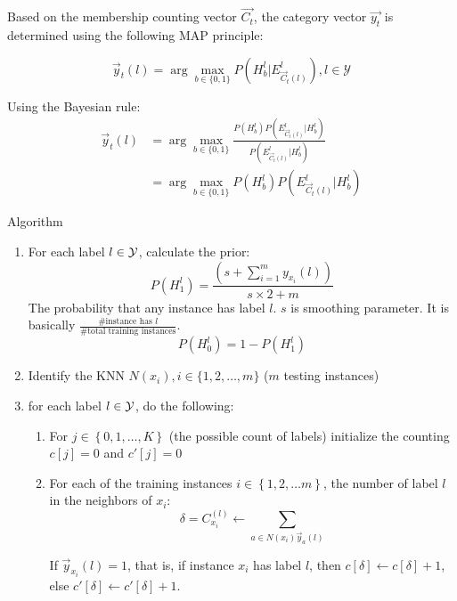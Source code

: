 Based on the membership counting vector $\vec{C_t}$, the category vector
$\vec{y_t}$ is determined using the following MAP principle:

\[ 
    \vec{y}_t(l) = \arg\max_{b\in \{0,1 \}} P(H_b^l|E_{\vec{C}_t(l)}^l), l
    \in \mathcal{Y}
\]

Using the Bayesian rule:
\begin{align*}
    \vec{y}_t(l) &= \arg\max_{b\in \{0, 1\}} \frac{P(H_b^l)
        P(E^l_{\vec{C}_t(l)}|H_b^l)}{P(E_{\vec{C}_t(l)}^l|H_b^l)} \\
        &= \arg\max_{b \in \{0, 1\}} P(H_b^l)P(E_{\vec{C}_t(l)}^l|H_b^l)
\end{align*}

Algorithm
\begin{enumerate}
    \item For each label $l \in \mathcal{Y}$, calculate the prior:
        \[P(H_1^l) = \frac{(s + \sum_{i=1}^m y_{x_i}(l))}{s \times 2 +
        m}\]
        The probability that any instance has label $l$. $s$ is smoothing
        parameter. It is basically $\frac{\#\mbox{instance has
        }l}{\#\mbox{total training instances}}$.
        \[ P(H_0^l) = 1 - P(H_1^l)\]
    \item Identify the KNN $N(x_i), i \in \{1, 2, \dots, m\}$ ($m$ testing
        instances)
    \item for each label $l \in \mathcal{Y}$, do the following:
        \begin{enumerate}
            \item For $j \in \left\{ 0, 1,
                \dots, K \right\}$ (the possible count of labels) initialize the counting $c[j] = 0$ and
                $c'[j] = 0$
            \item For each of the training instances $i \in \left\{ 1, 2,
                \dots m \right\}$, the number of label $l$ in the
                neighbors of $x_i$:
                \[ \delta = C_{x_i}^(l) \leftarrow \sum_{a\in
                N(x_i)\vec{y}_a(l)}\]

                If $\vec{y}_{x_i}(l) =  1$, that is, if instance $x_i$
                has label $l$,  then $c[\delta] \leftarrow
                c[\delta] + 1$, else $c'[\delta] \leftarrow c'[\delta]
                + 1$.


\end{enumerate}
\end{enumerate}
